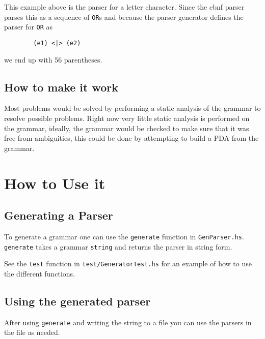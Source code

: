 \documentclass{article}
\begin{document}
    This example above is the parser for a letter character. 
    Since the ebnf parser parses this as a sequence of \texttt{OR}s 
    and because the parser generator defines the parser for \texttt{OR} as
    \begin{lstlisting}
        (e1) <|> (e2)
    \end{lstlisting}
     we end up with 56 parentheses.
\subsection{How to make it work}
    Most problems would be solved by performing a static analysis of the grammar to resolve possible problems.
    Right now very little static analysis is performed on the grammar, ideally, the grammar would be checked to make sure that it was free from ambiguities,
    this could be done by attempting to build a PDA from the grammar. 

\section{How to Use it}
\subsection{Generating a Parser}
To generate a grammar one can use the \texttt{generate} function in \texttt{GenParser.hs}.
\texttt{generate} takes a grammar \texttt{string} and returns the parser in string form.

See the \texttt{test} function in \texttt{test/GeneratorTest.hs} for an example of how to use the different functions.

\subsection{Using the generated parser}
After using \texttt{generate} and writing the string to a file you can use the parsers in the file as needed.





    
\end{document}
